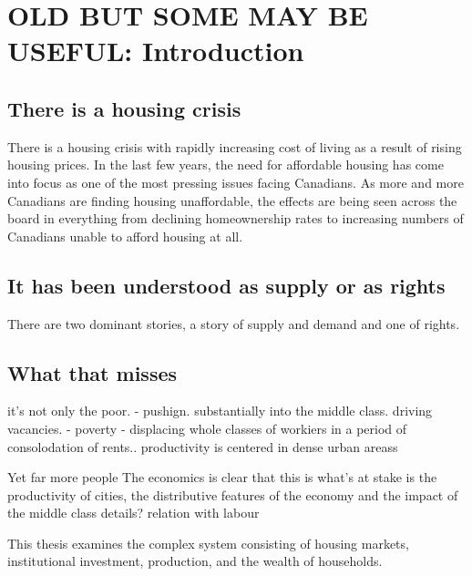 

\section{OLD BUT SOME MAY BE USEFUL: Introduction}


\subsection{There is a housing crisis}  %
There is a housing crisis with rapidly increasing cost of living as a result of rising housing prices. 
In the last few years, the need for affordable housing has come into focus as one of the most pressing issues facing Canadians. As more and more Canadians are finding housing unaffordable, the effects are being seen across the board in everything from declining homeownership rates to increasing numbers of Canadians unable to afford housing at all.

\subsection{It has been understood as supply or as rights}

There are two dominant stories, a story of supply and demand and one of rights.

\subsection{What that misses}

it's not only the poor. - pushign. substantially into the middle class. driving vacancies.   - poverty
- displacing whole classes of workiers
in a period of consolodation of rents..
productivity is centered in dense urban areass

Yet far more people
The economics is clear that this is what's at stake is the productivity of cities, the distributive features of the economy and the impact of the middle class %
details? relation with labour

This thesis examines the complex system consisting of  housing markets, institutional investment, production, and the wealth of households.

